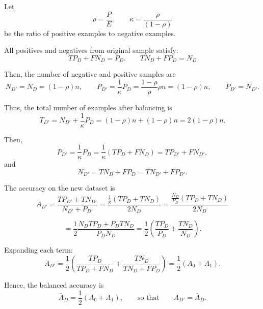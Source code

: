 \begin{answer}

Let
\[
\rho = \frac{P}{E}, \qquad \kappa = \frac{\rho}{(1 - \rho)}
\]
be the ratio of positive examples to negative examples.

All positives and negatives from original sample satisfy:
\[
TP_D + FN_D = P_D. \qquad TN_D + FP_D = N_D
\]

Then, the number of negative and positive samples are
\[
N_{D'} = N_D = (1 - \rho)n, 
\qquad 
P_{D'} = \frac{1}{\kappa} P_D = \frac{1 - \rho}{\rho} \rho n = (1 - \rho)n,
\qquad 
P_{D'} = N_{D'}.
\]

Thus, the total number of examples after balancing is
\[
T_{D'} = N_{D'} + \frac{1}{\kappa}P_D = (1 - \rho)n + (1 - \rho)n = 2(1 - \rho)n.
\]

Then,
\[
P_{D'} = \frac{1}{\kappa}P_D = \frac{1}{\kappa}(TP_D + FN_D) = TP_{D'} + FN_{D'},
\]
and
\[
N_{D'} = TN_D + FP_D = TN_{D'} + FP_{D'}.
\]

The accuracy on the new dataset is
\[
A_{D'} = \frac{TP_{D'} + TN_{D'} }
     { N_{D'} + P_{D'}}
= \frac{ \frac{1}{\kappa} (TP_D + TN_D) }
     {2N_D }
= \frac{ \frac{N_D}{P_D} (TP_D + TN_D) }
     {2N_D }
\]

\[
 = \frac{1}{2}
\frac{ N_D TP_D + P_D TN_D }
     {P_D N_D }
= \frac{1}{2}
  \left(
    \frac{TP_{D}}{P_{D}}
    + 
    \frac{TN_{D}}{N_{D}}
  \right).
\]

Expanding each term:
\[
A_{D'} = 
\frac{1}{2}
\left(
  \frac{TP_D}{TP_D + FN_D}
  + 
  \frac{TN_D}{TN_D + FP_D}
\right)
= \frac{1}{2}(A_0 + A_1).
\]

Hence, the balanced accuracy is
\[
\bar{A}_D = \frac{1}{2}(A_0 + A_1),
\qquad \text{so that} \qquad
A_{D'} = \bar{A}_D.
\]


\end{answer}